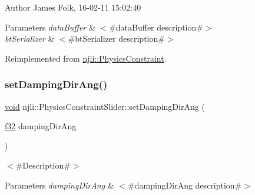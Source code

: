 \begin{DoxyAuthor}{Author}
James Folk, 16-\/02-\/11 15\+:02\+:40
\end{DoxyAuthor}

\begin{DoxyParams}{Parameters}
{\em data\+Buffer} & $<$\#data\+Buffer description\#$>$ \\
\hline
{\em bt\+Serializer} & $<$\#bt\+Serializer description\#$>$ \\
\hline
\end{DoxyParams}


Reimplemented from \mbox{\hyperlink{classnjli_1_1_physics_constraint_ae294d089963246a8e65b41913730efb1}{njli\+::\+Physics\+Constraint}}.

\mbox{\label{classnjli_1_1_physics_constraint_slider_a1db5431eae25f429aef438a3968cb6c8}} 
\subsubsection{\texorpdfstring{set\+Damping\+Dir\+Ang()}{setDampingDirAng()}}
{\footnotesize\ttfamily \mbox{\hyperlink{_thread_8h_af1e856da2e658414cb2456cb6f7ebc66}{void}} njli\+::\+Physics\+Constraint\+Slider\+::set\+Damping\+Dir\+Ang (\begin{DoxyParamCaption}\item[{\mbox{\hyperlink{_util_8h_a5f6906312a689f27d70e9d086649d3fd}{f32}}}]{damping\+Dir\+Ang }\end{DoxyParamCaption})}

$<$\#\+Description\#$>$


\begin{DoxyParams}{Parameters}
{\em damping\+Dir\+Ang} & $<$\#damping\+Dir\+Ang description\#$>$ \\
\hline
\end{DoxyParams}
\mbox{\label{classnjli_1_1_physics_constraint_slider_a51eddef7955b5089ff178c5c06c7bbe0}} 
